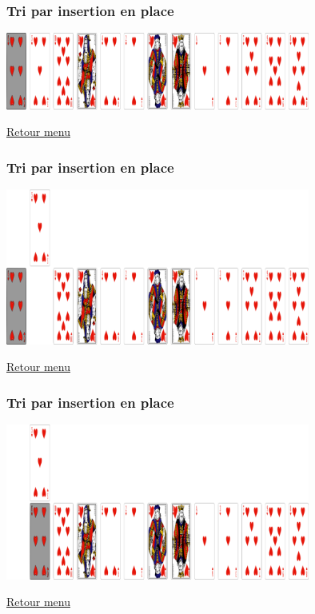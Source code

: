 \documentclass[svgnames,11pt]{beamer}
\begin{document}
\begin{frame}
    \frametitle{Tri par insertion en place}

    \begin{center}
        \centering
        \includegraphics[width=10cm]{ressources/insertion-2.png}
        \label{pique}
    \end{center}
    \hyperlink{menu}{Retour menu}

\end{frame}

\begin{frame}
    \frametitle{Tri par insertion en place}

    \begin{center}
        \centering
        \includegraphics[width=10cm]{ressources/insertion-3.png}
        \label{pique}
    \end{center}
    \hyperlink{menu}{Retour menu}

\end{frame}

\begin{frame}
    \frametitle{Tri par insertion en place}

    \begin{center}
        \centering
        \includegraphics[width=10cm]{ressources/insertion-4.png}
        \label{pique}
    \end{center}
    \hyperlink{menu}{Retour menu}

\end{frame}
\end{document}
